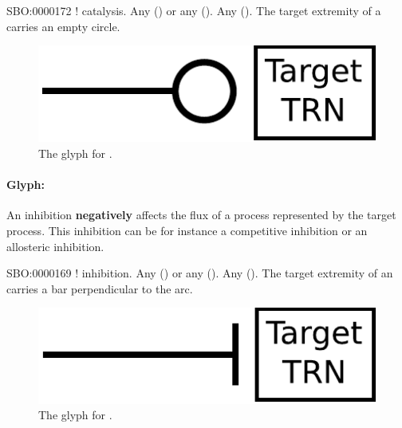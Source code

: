 \begin{glyphDescription}
 \glyphSboTerm SBO:0000172 ! catalysis.
 \glyphOrigin Any  () or any  ().
 \glyphTarget Any  ().
 \glyphNode The target extremity of a  carries an empty circle.
 \end{glyphDescription}

\begin{figure}[H]
  \centering
  \includegraphics[scale = 0.5]{images/catalysis}
  \caption{The \PD glyph for .}
  \label{fig:catalysis}
\end{figure}



\paragraph{Glyph: }\label{sec:inhibition}

An inhibition \textbf{negatively} affects the flux of a process represented by the target process. This inhibition can be for instance a competitive inhibition or an allosteric inhibition. 

\begin{glyphDescription}
 \glyphSboTerm SBO:0000169 ! inhibition.
 \glyphOrigin Any  () or any  ().
 \glyphTarget Any  ().
 \glyphNode The target extremity of an  carries a bar perpendicular to the arc.
 \end{glyphDescription}

\begin{figure}[H]
  \centering
  \includegraphics[scale = 0.5]{images/inhibition}
  \caption{The \PD glyph for .}
  \label{fig:inhibition}
\end{figure}

